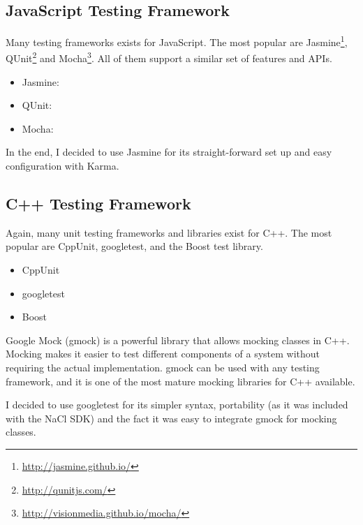 
\subsection{JavaScript Testing Framework} %
\label{sub:js_test_framework}
Many testing frameworks exists for JavaScript. The most popular are Jasmine\footnote{\url{http://jasmine.github.io/}}, QUnit\footnote{\url{http://qunitjs.com/}} and Mocha\footnote{\url{http://visionmedia.github.io/mocha/}}. All of them support a similar set of features and APIs. 

\begin{itemize}
	\item Jasmine: %
	\item QUnit:  %
	\item Mocha: %
\end{itemize}

In the end, I decided to use Jasmine for its straight-forward set up and easy configuration with Karma.


\subsection{C++ Testing Framework} %
\label{sub:cpp_testing}
Again, many unit testing frameworks and libraries exist for C++. The most popular are CppUnit, googletest, and the Boost test library.

\begin{itemize}
	\item CppUnit
	\item googletest
	\item Boost
\end{itemize}

Google Mock (gmock) is a powerful library that allows mocking classes in C++. Mocking makes it easier to test different components of a system without requiring the actual implementation. gmock can be used with any testing framework, and it is one of the most mature mocking libraries for C++ available.

I decided to use googletest for its simpler syntax, portability (as it was included with the NaCl SDK) and the fact it was easy to integrate gmock for mocking classes.


